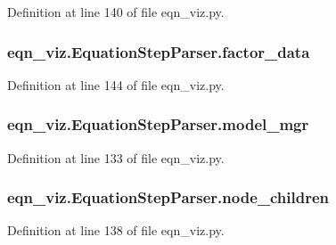 Definition at line 140 of file eqn\+\_\+viz.\+py.

\hypertarget{classeqn__viz_1_1_equation_step_parser_a0b9f938bbf87279aa6284bc2d679332f}{}
\subsubsection[{factor\+\_\+data}]{\setlength{\rightskip}{0pt plus 5cm}eqn\+\_\+viz.\+Equation\+Step\+Parser.\+factor\+\_\+data}\label{classeqn__viz_1_1_equation_step_parser_a0b9f938bbf87279aa6284bc2d679332f}


Definition at line 144 of file eqn\+\_\+viz.\+py.

\hypertarget{classeqn__viz_1_1_equation_step_parser_a93ede38f68a767bd5695118bbae0f4ab}{}
\subsubsection[{model\+\_\+mgr}]{\setlength{\rightskip}{0pt plus 5cm}eqn\+\_\+viz.\+Equation\+Step\+Parser.\+model\+\_\+mgr}\label{classeqn__viz_1_1_equation_step_parser_a93ede38f68a767bd5695118bbae0f4ab}


Definition at line 133 of file eqn\+\_\+viz.\+py.

\hypertarget{classeqn__viz_1_1_equation_step_parser_a1d4d9cccd84778db5989225109d04fff}{}
\subsubsection[{node\+\_\+children}]{\setlength{\rightskip}{0pt plus 5cm}eqn\+\_\+viz.\+Equation\+Step\+Parser.\+node\+\_\+children}\label{classeqn__viz_1_1_equation_step_parser_a1d4d9cccd84778db5989225109d04fff}


Definition at line 138 of file eqn\+\_\+viz.\+py.

